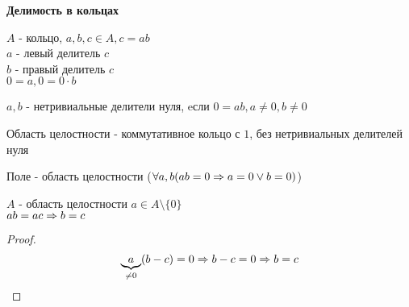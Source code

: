 \textbf{Делимость в кольцах}

$A$ - кольцо, $a, b, c \in A, c = ab$\\
$a$ - левый делитель $c$\\
$b$ - правый делитель $c$\\
$ 0 = a, 0 = 0 \cdot b$ \\
    
\begin{Def}
	$a, b$ - нетривиальные делители нуля, eсли $0 = ab, a \neq 0, b \neq 0$\\
\end{Def}
	
\begin{Def}	
	Область целостности - коммутативное кольцо с $1$, без нетривиальных делителей нуля\\
\end{Def}

\begin{Rem}
	Поле - область целостности ($\forall a, b (ab = 0 \Rightarrow a = 0 \vee b = 0)$)\\
\end{Rem}
	
\begin{theorem}{}
	$A$ - область целостности $a \in A \setminus \lbrace 0 \rbrace$\\
	$ab = ac \Rightarrow b = c$
\end{theorem}
	
\begin{proof}
	$$ \underbrace{a}_{\neq 0}(b - c) = 0 \Rightarrow b - c = 0 \Rightarrow b = c$$
\end{proof}	
